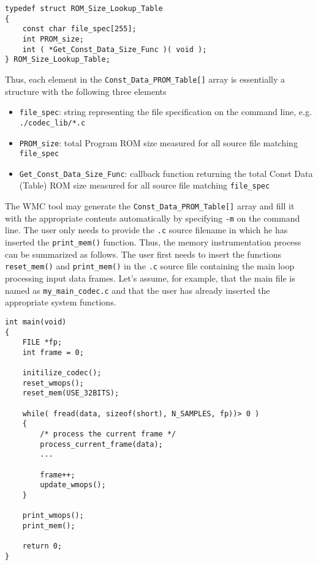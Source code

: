 \begin{Verbatim}[fontsize=\small]
typedef struct ROM_Size_Lookup_Table
{
    const char file_spec[255];
    int PROM_size;
    int ( *Get_Const_Data_Size_Func )( void );
} ROM_Size_Lookup_Table;
\end{Verbatim}

Thus, each element in the \verb|Const_Data_PROM_Table[]| array is essentially a structure with the following three elements

\begin{itemize}
  \item \verb|file_spec|: string representing the file specification on the command line, e.g. \verb|./codec_lib/*.c|
  \item \verb|PROM_size|: total Program ROM size measured for all source file matching \verb|file_spec|
  \item \verb|Get_Const_Data_Size_Func|: callback function returning the total Const Data (Table) ROM size measured for all source file matching \verb|file_spec|
\end{itemize}

The WMC tool may generate the \verb|Const_Data_PROM_Table[]| array and fill it with the appropriate contents automatically by specifying \verb|-m| on the command line. The user only needs to provide the \verb|.c| source filename in which he has inserted the \verb|print_mem()| function. Thus, the memory instrumentation process can be summarized as follows. The user first needs to insert the functions \verb|reset_mem()| and \verb|print_mem()| in the \verb|.c| source file containing the main loop processing input data frames. Let's assume, for example, that the main file is named as \verb|my_main_codec.c| and that the user has already inserted the appropriate system functions.

\begin{Verbatim}[fontsize=\small]
int main(void)
{
    FILE *fp;
    int frame = 0;

    initilize_codec();
    reset_wmops();
    reset_mem(USE_32BITS);

    while( fread(data, sizeof(short), N_SAMPLES, fp))> 0 )
    {
        /* process the current frame */
        process_current_frame(data);
        ...

        frame++;
        update_wmops();
    }

    print_wmops();
    print_mem();

    return 0;
}
\end{Verbatim}

